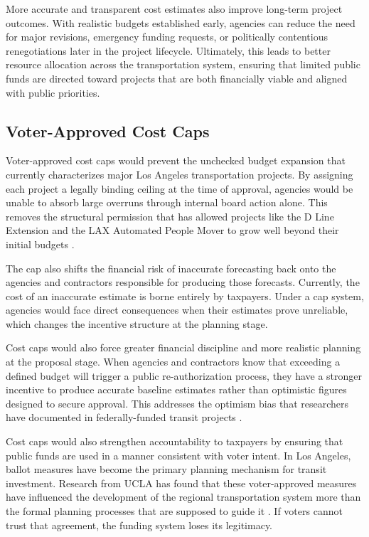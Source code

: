 \documentclass[12pt]{article}
\begin{document}
        More accurate and transparent cost estimates also improve long-term project outcomes. With realistic budgets established early, agencies can reduce the need for major revisions, emergency funding requests, or politically contentious renegotiations later in the project lifecycle. Ultimately, this leads to better resource allocation across the transportation system, ensuring that limited public funds are directed toward projects that are both financially viable and aligned with public priorities.

        \subsection{Voter-Approved Cost Caps}

        Voter-approved cost caps would prevent the unchecked budget expansion that currently characterizes major Los Angeles transportation projects. By assigning each project a legally binding ceiling at the time of approval, agencies would be unable to absorb large overruns through internal board action alone. This removes the structural permission that has allowed projects like the D Line Extension and the LAX Automated People Mover to grow well beyond their initial budgets \cite{p1, p5}.

        The cap also shifts the financial risk of inaccurate forecasting back onto the agencies and contractors responsible for producing those forecasts. Currently, the cost of an inaccurate estimate is borne entirely by taxpayers. Under a cap system, agencies would face direct consequences when their estimates prove unreliable, which changes the incentive structure at the planning stage.

        Cost caps would also force greater financial discipline and more realistic planning at the proposal stage. When agencies and contractors know that exceeding a defined budget will trigger a public re-authorization process, they have a stronger incentive to produce accurate baseline estimates rather than optimistic figures designed to secure approval. This addresses the optimism bias that researchers have documented in federally-funded transit projects \cite{p2, p3}.

        Cost caps would also strengthen accountability to taxpayers by ensuring that public funds are used in a manner consistent with voter intent. In Los Angeles, ballot measures have become the primary planning mechanism for transit investment. Research from UCLA has found that these voter-approved measures have influenced the development of the regional transportation system more than the formal planning processes that are supposed to guide it \cite{p9}. If voters cannot trust that agreement, the funding system loses its legitimacy.
\end{document}
